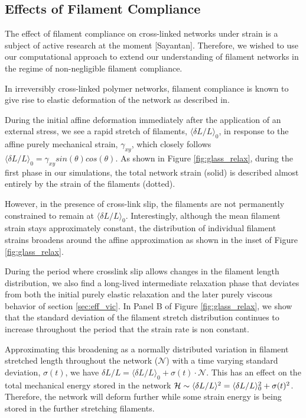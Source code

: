 \documentclass[pre,preprint]{revtex4-1}
\begin{document}
\subsection{Effects of Filament Compliance}
\label{sec:compliant}


The effect of filament compliance on cross-linked networks under strain is a subject of active research at the moment [Sayantan].  Therefore, we wished to use our computational approach to extend our understanding of filament networks in the regime of non-negligible filament compliance.  

In irreversibly cross-linked polymer networks, filament compliance is known to give rise to elastic deformation of the network as described in\cite{theo_hlm,theo_hlm2}.    

During the initial affine deformation immediately after the application of an external stress, we see a rapid stretch of filaments, $\langle \delta L/L\rangle_0$, in response to the affine purely mechanical strain, $\gamma_{xy}$, which closely follows $\langle \delta L/L\rangle_0 = \gamma_{xy}sin(\theta)cos(\theta)$. As shown in Figure \ref{fig:glass_relax}, during the first phase in our simulations, the total network strain (solid) is described almost entirely by the strain of the filaments (dotted).  

However, in the presence of cross-link slip, the filaments are not permanently constrained to remain at $\langle \delta L/L\rangle_0$.  Interestingly, although the mean filament strain stays approximately constant, the distribution of individual filament strains broadens around the affine approximation as shown in the inset of Figure \ref{fig:glass_relax}.  

During the period where crosslink slip allows changes in the filament length distribution, we also find a long-lived intermediate relaxation phase that deviates from both the initial purely elastic relaxation and the later purely viscous behavior of section \ref{sec:eff_vic}.  In Panel B of Figure \ref{fig:glass_relax}, we show that the standard deviation of the filament stretch distribution continues to increase throughout the period that the strain rate is non constant.   

Approximating this broadening as a normally distributed variation in filament stretched length throughout the network ($\mathcal{N}$) with a time varying standard deviation, $\sigma(t)$, we have $\delta L/L = \langle \delta L/L\rangle_0 + \sigma(t)\cdot\mathcal{N}$. 
 This has an effect on the total mechanical energy stored in the network ${\cal H} \sim  \langle\delta L/L\rangle^2 = \langle\delta L/L\rangle_0^2 +\sigma(t)^2 $.   Therefore, the network will deform further while some strain energy is being stored in the further stretching filaments.  
\end{document}
